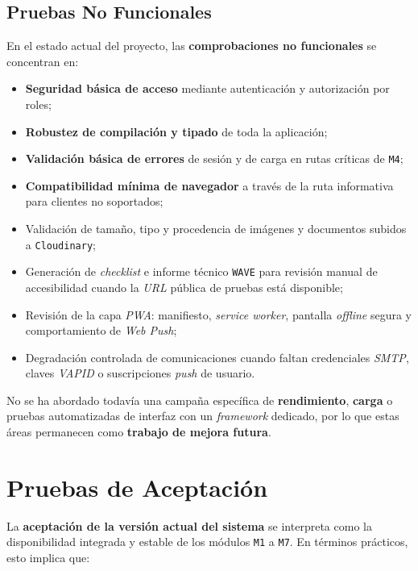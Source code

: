 \subsection{Pruebas No Funcionales}

En el estado actual del proyecto, las \textbf{comprobaciones no funcionales} se concentran en:

\begin{itemize}
    \item \textbf{Seguridad básica de acceso} mediante autenticación y autorización por roles;
    \item \textbf{Robustez de compilación y tipado} de toda la aplicación;
    \item \textbf{Validación básica de errores} de sesión y de carga en rutas críticas de \texttt{M4};
    \item \textbf{Compatibilidad mínima de navegador} a través de la ruta informativa para clientes no soportados;
    \item Validación de tamaño, tipo y procedencia de imágenes y documentos subidos a \texttt{Cloudinary};
    \item Generación de \textit{checklist} e informe técnico \texttt{WAVE} para revisión manual de accesibilidad cuando la \textit{URL} pública de pruebas está disponible;
    \item Revisión de la capa \textit{PWA}: manifiesto, \textit{service worker}, pantalla \textit{offline} segura y comportamiento de \textit{Web Push};
    \item Degradación controlada de comunicaciones cuando faltan credenciales \textit{SMTP}, claves \textit{VAPID} o suscripciones \textit{push} de usuario.
\end{itemize}

No se ha abordado todavía una campaña específica de \textbf{rendimiento}, \textbf{carga} o pruebas automatizadas de interfaz con un \textit{framework} dedicado, por lo que estas áreas permanecen como \textbf{trabajo de mejora futura}.

\section{Pruebas de Aceptación}

La \textbf{aceptación de la versión actual del sistema} se interpreta como la disponibilidad integrada y estable de los módulos \texttt{M1} a \texttt{M7}. En términos prácticos, esto implica que:


